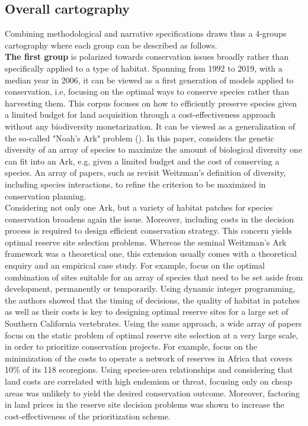 \subsection{Overall cartography}

Combining methodological and narrative specifications draws thus a 4-groups cartography where each group can be described as follows. 
\\
\hspace*{1.5em}\textbf{The first group} is polarized towards conservation issues broadly rather than specifically applied to a type of habitat. Spanning from 1992 to 2019, with a median year in 2006, it can be viewed as a first generation of models applied to conservation, i.e, focusing on the optimal ways to conserve species rather than harvesting them. This corpus focuses on how to efficiently preserve species given a limited budget for land acquisition through a cost-effectiveness approach without any biodiversity monetarization.
It can be viewed as a generalization of the so-called "Noah's Ark" problem (\cite{Weitzman98}).
In this paper, \citeauthor{Weitzman98} considers the genetic diversity of an array of species to maximize the amount of biological diversity one can fit into an Ark, e.g, given a limited budget and the cost of conserving a species. An array of papers, such as \cite{Courtois2014} revisit Weitzman's definition of diversity, including species interactions, to refine the criterion to be maximized in conservation planning. 
\\
Considering not only one Ark, but a variety of habitat patches for species conservation broadens again the issue. Moreover, including costs in the decision process is required to design efficient conservation strategy. This concern  yields optimal reserve site selection problems. Whereas the seminal Weitzman's Ark framework was a theoretical one, this extension usually comes with a theoretical enquiry and an empirical case study.  For example, \cite{COSTELLO2004} focus on the optimal combination of sites suitable for an array of species that need to be set aside from development, permanently or temporarily. Using dynamic integer programming, the authors showed that the timing of decisions, the quality of habitat in patches as well as their costs is key to designing optimal reserve sites for a large set of Southern California vertebrates. Using the same approach, a wide array of papers focus on the static problem of optimal reserve site selection at a very large scale, in order to prioritize conservation projects. For example, \cite{Moore2004} focus on the minimization of the costs to operate a network of reserves in Africa that covers 10\% of its 118 ecoregions. Using species-area relationships and considering that land costs are correlated with high endemism or threat, focusing only on cheap areas was unlikely to yield the desired conservation outcome. Moreover, factoring in land prices in the reserve site decision problems was shown to increase the cost-effectiveness of the prioritization scheme.
